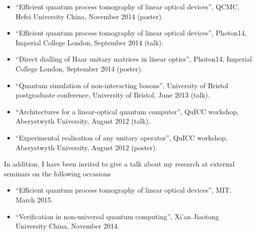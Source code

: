 \begin{itemize}
  \item ``Efficient quantum process tomography of linear optical devices'',
    QCMC, Hefei University China, November 2014 (poster).
  \item ``Efficient quantum process tomography of linear optical devices'',
    Photon14, Imperial College London, September 2014 (talk).
  \item ``Direct dialling of Haar unitary matrices in linear optics'', Photon14,
    Imperial College London, September 2014 (poster).
  \item ``Quantum simulation of non-interacting bosons'', University of Bristol
    postgraduate conference, University of Bristol, June 2013 (talk).
  \item ``Architectures for a linear-optical quantum computer'', QuICC workshop,
    Aberystwyth University, August 2012 (talk).
  \item ``Experimental realisation of any unitary operator'', QuICC workshop,
    Aberystwyth University, August 2012 (poster).
\end{itemize}
In addition, I have been invited to give a talk about my research at external
seminars on the following occasions
\begin{itemize}
  \item ``Efficient quantum process tomography of linear optical devices'',
    MIT, March 2015.
  \item ``Verification in non-universal quantum computing'', Xi'an Jiaotong
    University China, November 2014.
\end{itemize}
